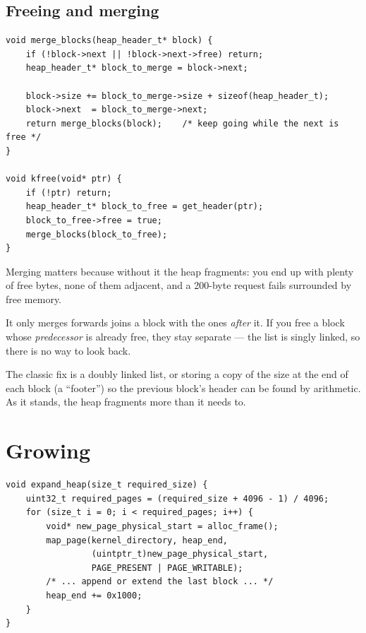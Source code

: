 \subsection{Freeing and merging}

\begin{lstlisting}[style=c]
void merge_blocks(heap_header_t* block) {
    if (!block->next || !block->next->free) return;
    heap_header_t* block_to_merge = block->next;

    block->size += block_to_merge->size + sizeof(heap_header_t);
    block->next  = block_to_merge->next;
    return merge_blocks(block);    /* keep going while the next is free */
}

void kfree(void* ptr) {
    if (!ptr) return;
    heap_header_t* block_to_free = get_header(ptr);
    block_to_free->free = true;
    merge_blocks(block_to_free);
}
\end{lstlisting}

Merging matters because without it the heap fragments: you end up with plenty of free bytes, none
of them adjacent, and a 200-byte request fails surrounded by free memory.

\begin{warn}{It only merges forwards}
 joins a block with the ones \emph{after} it. If you free a block whose
\emph{predecessor} is already free, they stay separate --- the list is singly linked, so there is no
way to look back.

The classic fix is a doubly linked list, or storing a copy of the size at the end of each block (a
``footer'') so the previous block's header can be found by arithmetic. As it stands, the heap
fragments more than it needs to.
\end{warn}

\section{Growing}

\begin{lstlisting}[style=c]
void expand_heap(size_t required_size) {
    uint32_t required_pages = (required_size + 4096 - 1) / 4096;
    for (size_t i = 0; i < required_pages; i++) {
        void* new_page_physical_start = alloc_frame();
        map_page(kernel_directory, heap_end,
                 (uintptr_t)new_page_physical_start,
                 PAGE_PRESENT | PAGE_WRITABLE);
        /* ... append or extend the last block ... */
        heap_end += 0x1000;
    }
}
\end{lstlisting}

